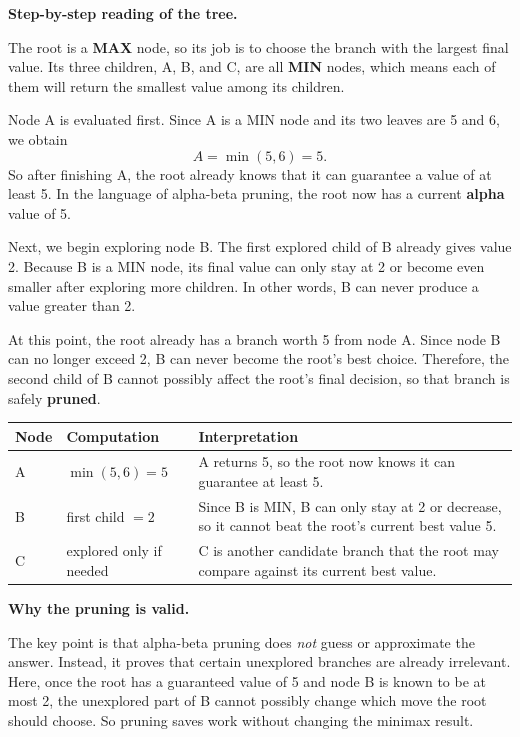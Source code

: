 \documentclass[11pt]{article}
\begin{document}
\noindent
\textbf{Step-by-step reading of the tree.}

The root is a \textbf{MAX} node, so its job is to choose the branch with the largest final value. Its three children, A, B, and C, are all \textbf{MIN} nodes, which means each of them will return the smallest value among its children.

Node A is evaluated first. Since A is a MIN node and its two leaves are 5 and 6, we obtain
\[
A = \min(5, 6) = 5.
\]
So after finishing A, the root already knows that it can guarantee a value of at least 5. In the language of alpha-beta pruning, the root now has a current \textbf{alpha} value of 5.

Next, we begin exploring node B. The first explored child of B already gives value 2. Because B is a MIN node, its final value can only stay at 2 or become even smaller after exploring more children. In other words, B can never produce a value greater than 2.

At this point, the root already has a branch worth 5 from node A. Since node B can no longer exceed 2, B can never become the root's best choice. Therefore, the second child of B cannot possibly affect the root's final decision, so that branch is safely \textbf{pruned}.

\begin{center}
\begin{tabularx}{0.96\textwidth}{>{\raggedright\arraybackslash}p{} >{\raggedright\arraybackslash}p{} X}
\toprule
\textbf{Node} & \textbf{Computation} & \textbf{Interpretation} \\
\midrule
A & $\min(5,6)=5$ & A returns 5, so the root now knows it can guarantee at least 5. \\
B & first child $=2$ & Since B is MIN, B can only stay at 2 or decrease, so it cannot beat the root's current best value 5. \\
C & explored only if needed & C is another candidate branch that the root may compare against its current best value. \\
\bottomrule
\end{tabularx}
\end{center}

\noindent
\textbf{Why the pruning is valid.}

The key point is that alpha-beta pruning does \emph{not} guess or approximate the answer. Instead, it proves that certain unexplored branches are already irrelevant. Here, once the root has a guaranteed value of 5 and node B is known to be at most 2, the unexplored part of B cannot possibly change which move the root should choose. So pruning saves work without changing the minimax result.
\end{document}
